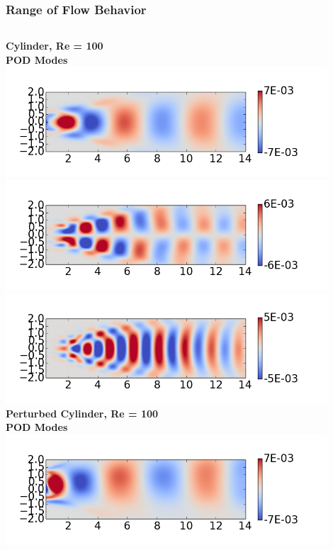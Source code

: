 \documentclass[9pt]{beamer}
\begin{document}
\begin{frame}
\frametitle{Range of Flow Behavior}
\label{sec-3-2}

\begin{columns}[c]
   \centering
    \textbf{Cylinder, Re = 100}
     \\
    \textbf{POD Modes} \\
    \includegraphics[width=0.9\textwidth]{CylinderRe100POD1} \\
    \includegraphics[width=0.9\textwidth]{CylinderRe100POD2} \\
    \includegraphics[width=0.9\textwidth]{CylinderRe100POD3}
   \centering
    \textbf{Perturbed Cylinder, Re = 100}
     \\
    \textbf{POD Modes} \\
    \includegraphics[width=0.9\textwidth]{PerturbRp95Re100POD1} \\

\end{columns}
\end{frame}
\end{document}
